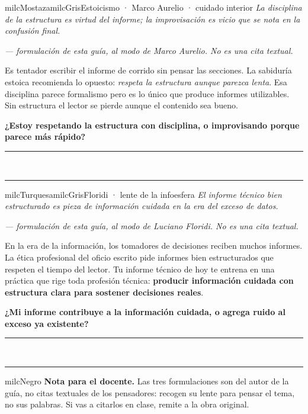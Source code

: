 \documentclass[11pt,letterpaper]{article}
\newcommand{\linead}[1]{\noindent\color{milcLinea}\rule{#1}{0.5pt}\color{milcNegro}}
\begin{document}
\begin{softbox}{milcMostaza}{milcGris}{Estoicismo · Marco Aurelio · cuidado interior}
\textit{La disciplina de la estructura es virtud del informe; la improvisación es vicio que se nota en la confusión final.}

{\footnotesize\itshape\color{milcNegro!70}--- formulación de esta guía, al modo de Marco Aurelio. No es una cita textual.}

Es tentador escribir el informe de corrido sin pensar las secciones. La sabiduría estoica recomienda lo opuesto: \emph{respeta la estructura aunque parezca lenta}. Esa disciplina parece formalismo pero es lo único que produce informes utilizables. Sin estructura el lector se pierde aunque el contenido sea bueno.

\textbf{¿Estoy respetando la estructura con disciplina, o improvisando porque parece más rápido?}
\end{softbox}
\linead{\linewidth}\\[1mm]
\linead{\linewidth}

\begin{softbox}{milcTurquesa}{milcGris}{Floridi · lente de la infoesfera}
\textit{El informe técnico bien estructurado es pieza de información cuidada en la era del exceso de datos.}

{\footnotesize\itshape\color{milcNegro!70}--- formulación de esta guía, al modo de Luciano Floridi. No es una cita textual.}

En la era de la información, los tomadores de decisiones reciben muchos informes. La ética profesional del oficio escrito pide informes bien estructurados que respeten el tiempo del lector. Tu informe técnico de hoy te entrena en una práctica que rige toda profesión técnica: \textbf{producir información cuidada con estructura clara para sostener decisiones reales}.

\textbf{¿Mi informe contribuye a la información cuidada, o agrega ruido al exceso ya existente?}
\end{softbox}
\linead{\linewidth}\\[1mm]
\linead{\linewidth}

\begin{infoband}{milcNegro}
\textbf{Nota para el docente.} Las tres formulaciones son del autor de la guía, no citas textuales de los pensadores: recogen su lente para pensar el tema, no sus palabras. Si vas a citarlos en clase, remite a la obra original.
\end{infoband}
\end{document}
